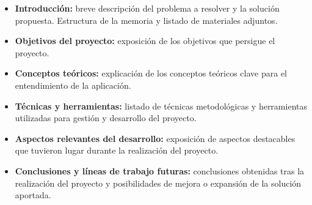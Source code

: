 \begin{itemize}
\tightlist
\item
  \textbf{Introducción:} breve descripción del problema a resolver y la
  solución propuesta. Estructura de la memoria y listado de materiales
  adjuntos.
\item
  \textbf{Objetivos del proyecto:} exposición de los objetivos que
  persigue el proyecto.
\item
  \textbf{Conceptos teóricos:} explicación de los conceptos
  teóricos clave para el entendimiento de la aplicación.
\item
  \textbf{Técnicas y herramientas:} listado de técnicas metodológicas y
  herramientas utilizadas para gestión y desarrollo del proyecto.
\item
  \textbf{Aspectos relevantes del desarrollo:} exposición de aspectos
  destacables que tuvieron lugar durante la realización del proyecto.
\item
  \textbf{Conclusiones y líneas de trabajo futuras:} conclusiones
  obtenidas tras la realización del proyecto y posibilidades de mejora o
  expansión de la solución aportada.
\end{itemize}

